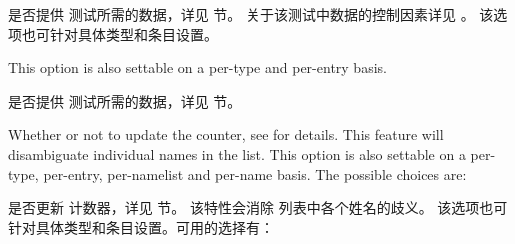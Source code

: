 \begin{optionlist}


是否提供  测试所需的数据，详见  节。
关于该测试中数据的控制因素详见 。
该选项也可针对具体类型和条目设置。



This option is also settable on a per-type and per-entry basis.

是否提供  测试所需的数据，详见  节。



 Whether or not to update the  counter, see  for details. This feature will disambiguate individual names in the  list. This option is also settable on a per-type, per-entry, per-namelist and per-name basis. The possible choices are:

是否更新  计数器，详见  节。
该特性会消除  列表中各个姓名的歧义。
该选项也可针对具体类型和条目设置。可用的选择有：


\end{optionlist}
